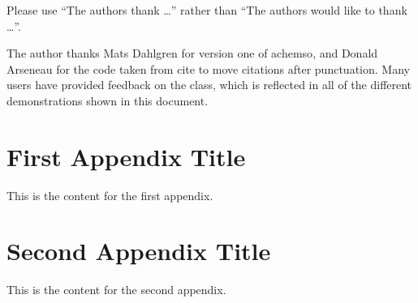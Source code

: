 \documentclass[journal=jacsat,manuscript=article]{achemso}
\begin{document}
\begin{acknowledgement}

Please use ``The authors thank \ldots'' rather than ``The
authors would like to thank \ldots''.

The author thanks Mats Dahlgren for version one of \textsf{achemso},
and Donald Arseneau for the code taken from \textsf{cite} to move
citations after punctuation. Many users have provided feedback on the
class, which is reflected in all of the different demonstrations
shown in this document.

\end{acknowledgement}

\clearpage
\appendix

\renewcommand{\thesection}{Appendix \Alph{section}}

\section{First Appendix Title}
This is the content for the first appendix.

\section{Second Appendix Title}
This is the content for the second appendix.

% 

\end{document}

